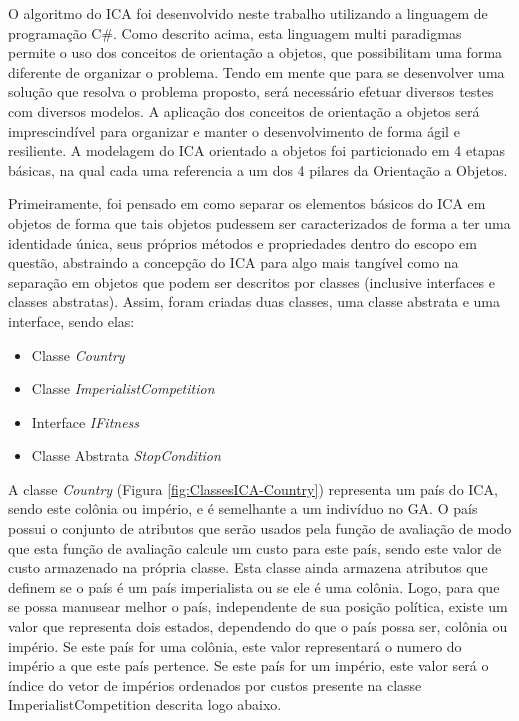 O algoritmo do ICA foi desenvolvido neste trabalho utilizando a linguagem de programação C\#. Como descrito acima, esta linguagem multi paradigmas permite o uso dos conceitos de orientação a objetos, que possibilitam uma forma diferente de organizar o problema. Tendo em mente que para se desenvolver uma solução que resolva o problema proposto, será necessário efetuar diversos testes com diversos modelos. A aplicação dos conceitos de orientação a objetos será imprescindível para organizar e manter o desenvolvimento de forma ágil e resiliente. A modelagem do ICA orientado a objetos foi particionado em 4 etapas básicas, na qual cada uma referencia a um dos 4 pilares da Orientação a Objetos.

Primeiramente, foi pensado em como separar os elementos básicos do ICA em objetos de forma que tais objetos pudessem ser caracterizados de forma a ter uma identidade única, seus próprios métodos e propriedades dentro do escopo em questão, abstraindo a concepção do ICA para algo mais tangível como na separação em objetos que podem ser descritos por classes (inclusive interfaces e classes abstratas). Assim, foram criadas duas classes, uma classe abstrata e uma interface, sendo elas:
\begin{itemize}
\item Classe \emph{ Country }
\item Classe \emph{ImperialistCompetition  }
\item Interface \emph{IFitness}
\item Classe Abstrata \emph{ StopCondition}
\end{itemize}

A classe \emph{Country} (Figura \ref{fig:ClassesICA-Country})  representa um país do ICA, sendo este colônia ou império, e é semelhante a um indivíduo no GA. O país possui o conjunto de atributos que serão usados pela função de avaliação de modo que esta função de avaliação calcule um custo para este país, sendo este valor de custo armazenado na própria classe. Esta classe ainda armazena atributos que definem se o país é um país imperialista ou se ele é uma colônia. Logo, para que se possa manusear melhor o país, independente de sua posição política, existe um valor que representa dois estados, dependendo do que o país possa ser, colônia ou império. Se este país for uma colônia, este valor representará o numero do império a que este país pertence. Se este país for um império, este valor será o índice do vetor de impérios ordenados por custos presente na classe ImperialistCompetition descrita logo abaixo.

